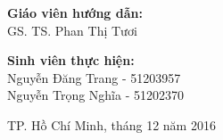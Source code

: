 \documentclass[12pt]{report}
\begin{document}
\begin{titlepage}
\begin{flushright}
\begin{minipage}{0.7\textwidth}

\end{minipage}
\end{flushright}

\begin{flushleft} \large
\textbf{Giáo viên hướng dẫn:}\\
GS. TS. Phan Thị Tươi\\[2.0cm]
\end{flushleft}

\begin{flushleft} \large
\textbf{Sinh viên thực hiện:}\\
Nguyễn Đăng Trang - 51203957\\
Nguyễn Trọng Nghĩa - 51202370\\[2cm]
\end{flushleft}

\begin{flushleft} \large
\centering
TP. Hồ Chí Minh, tháng 12 năm 2016
\end{flushleft}

\vfill %

\end{titlepage}

\newpage
	\thispagestyle{empty}
	\tableofcontents

\newpage
	\listoffigures
	\listoftables

\newpage
\end{document}
